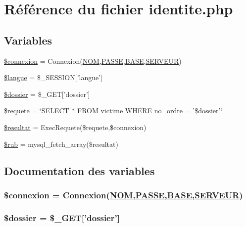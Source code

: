 \hypertarget{identite_8php}{
\section{R\'{e}f\'{e}rence du fichier identite.php}
\label{identite_8php}
}
\subsection*{Variables}
\begin{CompactItemize}
\item 
\hyperlink{identite_8php_a0}{\$connexion} = Connexion(\hyperlink{pma__connect_8php_a0}{NOM},\hyperlink{pma__connect_8php_a1}{PASSE},\hyperlink{pma__connect_8php_a3}{BASE},\hyperlink{pma__connect_8php_a2}{SERVEUR})
\item 
\hyperlink{identite_8php_a1}{\$langue} = \$\_\-SESSION\mbox{[}'langue'\mbox{]}
\item 
\hyperlink{identite_8php_a2}{\$dossier} = \$\_\-GET\mbox{[}'dossier'\mbox{]}
\item 
\hyperlink{identite_8php_a3}{\$requete} = \char`\"{}SELECT $\ast$ FROM victime WHERE no\_\-ordre = '\$dossier'\char`\"{}
\item 
\hyperlink{identite_8php_a4}{\$resultat} = Exec\-Requete(\$requete,\$connexion)
\item 
\hyperlink{identite_8php_a5}{\$rub} = mysql\_\-fetch\_\-array(\$resultat)
\end{CompactItemize}


\subsection{Documentation des variables}
\hypertarget{identite_8php_a0}{
\subsubsection[\$connexion]{\setlength{\rightskip}{0pt plus 5cm}\$connexion = Connexion(\hyperlink{pma__connect_8php_a0}{NOM},\hyperlink{pma__connect_8php_a1}{PASSE},\hyperlink{pma__connect_8php_a3}{BASE},\hyperlink{pma__connect_8php_a2}{SERVEUR})}}
\label{identite_8php_a0}


\hypertarget{identite_8php_a2}{
\subsubsection[\$dossier]{\setlength{\rightskip}{0pt plus 5cm}\$dossier = \$\_\-GET\mbox{[}'dossier'\mbox{]}}}
\label{identite_8php_a2}


